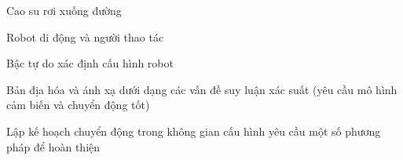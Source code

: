 \documentclass{article}
\begin{document}
\begin{huge}

\vspace*{0.3in}

\maxfigwidth
{}



\vspace*{0.3in}

\textwidth
\centerline{  }


\vspace*{0.3in}

\textwidth
\centerline{  }




\vspace*{0.3in}

\textwidth
\centerline{  }



Cao su rơi xuống đường

Robot di động và người thao tác

Bậc tự do xác định cấu hình robot

Bản địa hóa và ánh xạ dưới dạng các vấn đề suy luận xác suất\al
  (yêu cầu mô hình cảm biến và chuyển động tốt)

Lập kế hoạch chuyển động trong không gian cấu hình\al
  yêu cầu một số phương pháp để hoàn thiện



\end{huge}
\end{document}

